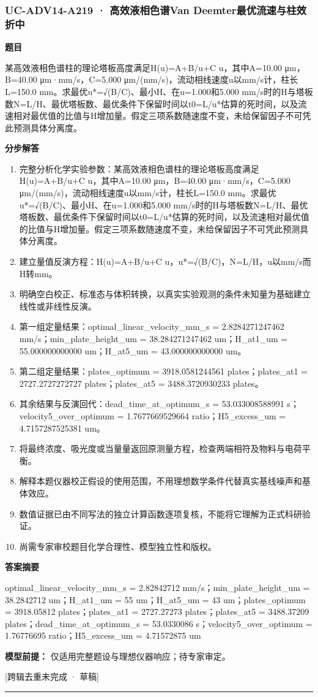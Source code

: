 \documentclass[UTF8,11pt,a4paper]{ctexart}
\begin{document}
\subsubsection*{UC-ADV14-A219 · 高效液相色谱Van Deemter最优流速与柱效折中}
\noindent\textbf{题目}\par
某高效液相色谱柱的理论塔板高度满足H(u)=A+B/u+C u，其中A=10.00 μm，B=40.00 μm·mm/s，C=5.000 μm/(mm/s)，流动相线速度u以mm/s计，柱长L=150.0 mm。求最优u*=√(B/C)、最小H、在u=1.000和5.000 mm/s时的H与塔板数N=L/H、最优塔板数、最优条件下保留时间以t0=L/u*估算的死时间，以及流速相对最优值的比值与H增加量。假定三项系数随速度不变，未给保留因子不可凭此预测具体分离度。\par
\medskip\noindent\textbf{分步解答}
\begin{enumerate}
\item 完整分析化学实验参数：某高效液相色谱柱的理论塔板高度满足H(u)=A+B/u+C u，其中A=10.00 μm，B=40.00 μm·mm/s，C=5.000 μm/(mm/s)，流动相线速度u以mm/s计，柱长L=150.0 mm。求最优u*=√(B/C)、最小H、在u=1.000和5.000 mm/s时的H与塔板数N=L/H、最优塔板数、最优条件下保留时间以t0=L/u*估算的死时间，以及流速相对最优值的比值与H增加量。假定三项系数随速度不变，未给保留因子不可凭此预测具体分离度。
\item 建立量值反演方程：H(u)=A+B/u+C u，u*=√(B/C)，N=L/H，u以mm/s而H转mm。
\item 明确空白校正、标准态与体积转换，以真实实验观测的条件未知量为基础建立线性或非线性反演。
\item 第一组定量结果：optimal\_linear\_velocity\_mm\_s = 2.8284271247462 mm/s；min\_plate\_height\_um = 38.284271247462 um；H\_at1\_um = 55.000000000000 um；H\_at5\_um = 43.000000000000 um。
\item 第二组定量结果：plates\_optimum = 3918.0581244561 plates；plates\_at1 = 2727.2727272727 plates；plates\_at5 = 3488.3720930233 plates。
\item 其余结果与反演回代：dead\_time\_at\_optimum\_s = 53.033008588991 s；velocity5\_over\_optimum = 1.7677669529664 ratio；H5\_excess\_um = 4.7157287525381 um。
\item 将最终浓度、吸光度或当量量返回原测量方程，检查两端相符及物料与电荷平衡。
\item 解释本题仪器校正假设的使用范围，不用理想数学条件代替真实基线噪声和基体效应。
\item 数值证据已由不同写法的独立计算函数逐项复核，不能将它理解为正式科研验证。
\item 尚需专家审校题目化学合理性、模型独立性和版权。
\end{enumerate}
\noindent\textbf{答案摘要}\par
optimal\_linear\_velocity\_mm\_s = 2.82842712 mm/s；min\_plate\_height\_um = 38.2842712 um；H\_at1\_um = 55 um；H\_at5\_um = 43 um；plates\_optimum = 3918.05812 plates；plates\_at1 = 2727.27273 plates；plates\_at5 = 3488.37209 plates；dead\_time\_at\_optimum\_s = 53.0330086 s；velocity5\_over\_optimum = 1.76776695 ratio；H5\_excess\_um = 4.71572875 um\par
\noindent\textbf{模型前提：}
仅适用完整题设与理想仪器响应；待专家审定。\par
\noindent\textcolor{red!65!black}{[跨辑去重未完成 · 草稿]} \par
\medskip\hrule\medskip
{}
\end{document}
